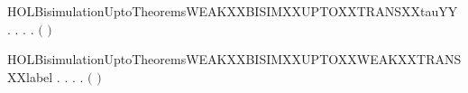 \begin{SaveVerbatim}{HOLBisimulationUptoTheoremsWEAKXXBISIMXXUPTOXXTRANSXXtauYY}
\HOLTokenTurnstile{} \HOLSymConst{\HOLTokenForall{}}.
         \HOLSymConst{\HOLTokenImp{}}
       \HOLSymConst{\HOLTokenForall{}} .
              \HOLSymConst{\HOLTokenImp{}}
           \HOLSymConst{\HOLTokenForall{}}.
                \HOLTokenTransBegin\HOLConst{\ensuremath{\tau}}\HOLTokenTransEnd {} \HOLSymConst{\HOLTokenImp{}}
               \HOLSymConst{\HOLTokenExists{}}.
                      \HOLSymConst{\HOLTokenConj{}}
                   \ensuremath{(}    \ensuremath{)}  
\end{SaveVerbatim}
\newcommand{\HOLBisimulationUptoTheoremsWEAKXXBISIMXXUPTOXXTRANSXXtauYY}{\UseVerbatim{HOLBisimulationUptoTheoremsWEAKXXBISIMXXUPTOXXTRANSXXtauYY}}
\begin{SaveVerbatim}{HOLBisimulationUptoTheoremsWEAKXXBISIMXXUPTOXXWEAKXXTRANSXXlabel}
\HOLTokenTurnstile{} \HOLSymConst{\HOLTokenForall{}}.
         \HOLSymConst{\HOLTokenImp{}}
       \HOLSymConst{\HOLTokenForall{}} .
              \HOLSymConst{\HOLTokenImp{}}
           \HOLSymConst{\HOLTokenForall{}} .
                \HOLTokenWeakTransBegin{} \HOLTokenWeakTransEnd {} \HOLSymConst{\HOLTokenImp{}}
               \HOLSymConst{\HOLTokenExists{}}.
                    \HOLTokenWeakTransBegin{} \HOLTokenWeakTransEnd {} \HOLSymConst{\HOLTokenConj{}}
                   \ensuremath{(}    \ensuremath{)}  
\end{SaveVerbatim}
\newcommand{\HOLBisimulationUptoTheoremsWEAKXXBISIMXXUPTOXXWEAKXXTRANSXXlabel}{\UseVerbatim{HOLBisimulationUptoTheoremsWEAKXXBISIMXXUPTOXXWEAKXXTRANSXXlabel}}
